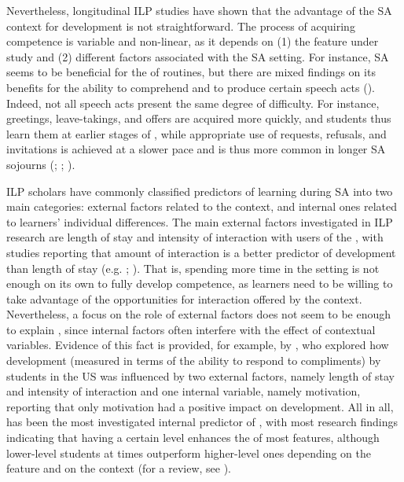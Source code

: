 \documentclass[output=paper]{langsci/langscibook}
\begin{document}
Nevertheless, longitudinal ILP studies have shown that the advantage of the SA context for  development is not straightforward. The process of acquiring   competence is variable and non-linear, as it depends on (1) the  feature under study and (2) different factors associated with the SA setting. For instance, SA seems to be beneficial for the  of  routines, but there are mixed findings on its benefits for the ability to comprehend  and to produce certain speech acts (\citealt{TaguchiRoever2017}). Indeed, not all speech acts present the same degree of difficulty. For instance, greetings, leave-takings, and offers are acquired more quickly, and students thus learn them at earlier stages of , while appropriate use of requests, refusals, and invitations is achieved at a slower pace and is thus more common in longer SA sojourns (\citealt{Barron2003}; \citealt{Félix-Brasdefer2004}; \citealt{Hassall2006}).

ILP scholars have commonly classified predictors of  learning during SA into two main categories: external factors related to the context, and internal ones related to learners’ individual differences. The main external factors investigated in ILP research are length of stay and intensity of interaction with users of the , with studies reporting that amount of interaction is a better predictor of  development than length of stay (e.g. \citealt{Bardovi-HarligBastos2011}; \citealt{Bella2011}). That is, spending more time in the  setting is not enough on its own to fully develop  competence, as  learners need to be willing to take advantage of the opportunities for interaction offered by the context. Nevertheless, a focus on the role of external factors does not seem to be enough to explain   , since internal factors often interfere with the effect of contextual variables. Evidence of this fact is provided, for example, by \citet{EslamiAhn2014}, who explored how  development (measured in terms of the ability to respond to compliments) by  students in the US was influenced by two external factors, namely length of stay and intensity of interaction and one internal variable, namely motivation, reporting that only motivation had a positive impact on  development. All in all,  has been the most investigated internal predictor of  , with most research findings indicating that having a certain  level enhances the  of most  features, although lower-level students at times outperform higher-level ones depending on the  feature and on the context (for a review, see \citealt{Xiao2015}).
\end{document}
